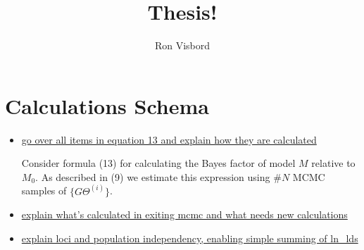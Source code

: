\documentclass[11pt]{article}
\author{Ron Visbord}
\title{Thesis!}
\begin{document}
\maketitle


\section{Calculations Schema}

\begin{itemize}
\item \underline{go over all items in equation 13 and explain how they are calculated}

Consider formula (13) for calculating the Bayes factor of model $M$ relative to $M_0$. As described in (9) we estimate this expression using $\#N$ MCMC samples of $\{G\Theta^{(i)}\}$. 

\item \underline{explain what's calculated in exiting mcmc and what needs new calculations}

\item \underline{explain loci and population independency, enabling simple summing of ln\_lds}

\end{itemize}
\end{document}
